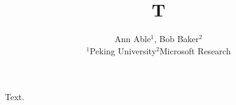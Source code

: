 \documentclass{article}
\begin{document}
\title{T}
\author{Ann Able$^{1}$, Bob Baker$^{2}$ \\ $^{1}$Peking University$^{2}$Microsoft Research}
\maketitle
Text.
\end{document}
